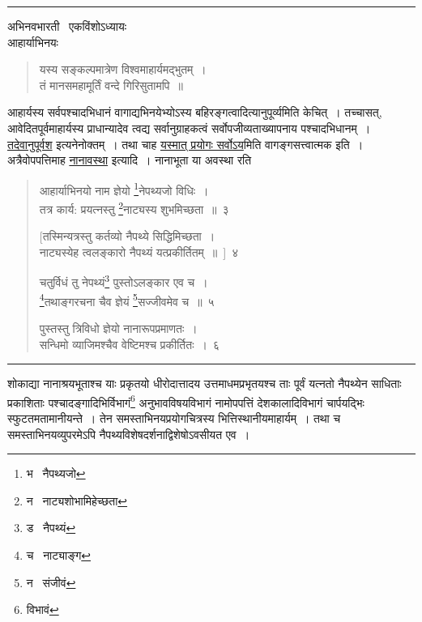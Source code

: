 \documentclass[11pt, openany]{book}
\begin{document}
\hrule

\begin{center}
अभिनवभारती \textendash\ एकविंशोऽध्यायः\\

आहार्याभिनयः
\end{center}

\begin{quote}
{\qt यस्य सङ्कल्पमात्रेण विश्वमाहार्यमद्भुतम्~।\\
तं मानसमहामूर्तिं वन्दे गिरिसुतामपि~॥}
\end{quote}

आहार्यस्य सर्वपश्चादभिधानं वागाद्यभिनयेभ्योऽस्य बहिरङ्गत्वादित्यानुपूर्व्यमिति केचित्~। तच्चासत्, आवेदितपूर्वमाहार्यस्य प्राधान्यादेव त्वद्य सर्वानुग्राहकत्वं सर्वोपजीव्यताख्यापनाय पश्चादभिधानम्~। \underline{तदेवानुपूर्वश} इत्यनेनोक्तम्~। तथा चाह \underline{यस्मात् प्रयोगः सर्वोऽय}मिति वागङ्गसत्त्वात्मक इति~।\\

अत्रैवोपपत्तिमाह \underline{नानावस्था} इत्यादि~। नानाभूता या अवस्था रति\textendash

\newpage
{}

\begin{quote}
{\na आहार्याभिनयो नाम ज्ञेयो \renewcommand{\thefootnote}{1}\footnote{भ \textendash\ नैपथ्यजो}नेपथ्यजो विधिः~।\\
तत्र कार्य: प्रयत्नस्तु \renewcommand{\thefootnote}{2}\footnote{न \textendash\ नाट्यशोभामिहेच्छता}नाट्यस्य शुभमिच्छता~॥~३

[तस्मिन्यत्रस्तु कर्तव्यो नैपथ्ये सिद्धिमिच्छता~।\\
नाट्यस्येह त्वलङ्कारो नैपथ्यं यत्प्रकीर्तितम्~॥~]~४

चतुर्विधं तु नेपथ्यं\renewcommand{\thefootnote}{3}\footnote{ड \textendash\ नैपथ्यं} पुस्तोऽलङ्कार एव च~।\\
\renewcommand{\thefootnote}{4}\footnote{च \textendash\ नाट्याङ्ग}तथाङ्गरचना चैव ज्ञेयं \renewcommand{\thefootnote}{5}\footnote{न \textendash\ संजीवं}सज्जीवमेव च~॥~५

पुस्तस्तु त्रिविधो ज्ञेयो नानारूपप्रमाणतः~।\\
सन्धिमो व्याजिमश्चैव वेष्टिमश्च प्रकीर्तितः~।~६}
\end{quote}

\hrule

\vspace{2mm}
\noindent
शोकाद्या नानाश्रयभूताश्च याः प्रकृतयो धीरोदात्तादय उत्तमाधमप्रभृतयश्च ताः पूर्वं यत्नतो नैपथ्येन साधिताः प्रकाशिताः पश्चादङ्गादिभिर्विभागं\renewcommand{\thefootnote}{1}\footnote{विभावं} अनुभावविषयविभागं नामोपपत्तिं देशकालादिविभागं चार्पयद्भिः स्फुटतमतामानीयन्ते~। तेन समस्ताभिनयप्रयोगचित्रस्य भित्तिस्थानीयमाहार्यम्~। तथा च समस्ताभिनयव्युपरमेऽपि नैपथ्यविशेषदर्शनाद्विशेषोऽवसीयत एव~।\\
\end{document}
